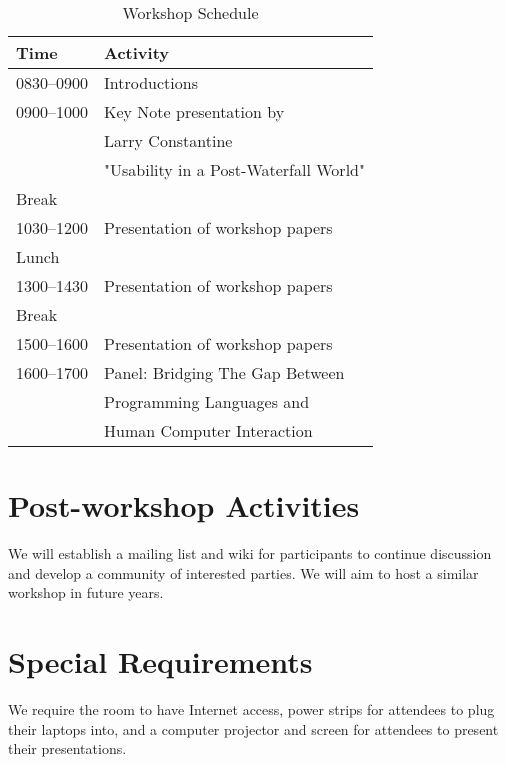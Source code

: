 \documentclass{acm_proc_article-sp}
\begin{document}
\begin{table} [!htbp] %
\caption{Workshop Schedule}
\begin{tabular}{|l|l|}
\hline \textbf{Time}   & \textbf{Activity}\\
\hline 0830--0900    & Introductions\\
\hline 0900--1000    & Key Note presentation by\\
                                    & Larry Constantine\\
                                    & "Usability in a Post-Waterfall World"\\
\hline Break              & \\
\hline 1030--1200   & Presentation of workshop papers\\
\hline Lunch             & \\
\hline 1300--1430   & Presentation of workshop papers\\
\hline Break              & \\
\hline 1500--1600    & Presentation of workshop papers\\
\hline 1600--1700    & Panel: Bridging The Gap Between\\
                     & Programming Languages and\\
                     & Human Computer Interaction\\
\hline
\end{tabular}
\label{tab:schedule}
\end{table}

\section{Post-workshop Activities}

We will establish a mailing list and wiki for participants 
to continue discussion and develop a community of 
interested parties. 
We will aim to host a similar workshop in future years.

\section{Special Requirements}

We require the room to have Internet access, power strips for 
attendees to plug their laptops into, and a computer projector 
and screen for attendees to present their presentations.

% 
%  
\end{document}
